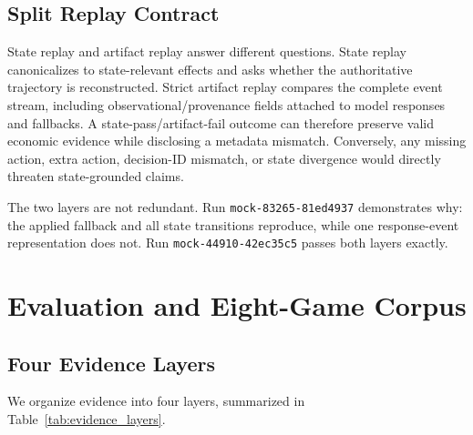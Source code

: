 \documentclass[conference]{IEEEtran}
\newcommand{\code}[1]{\texttt{#1}}
\begin{document}
\subsection{Split Replay Contract}

State replay and artifact replay answer different questions. State replay canonicalizes to state-relevant effects and asks whether the authoritative trajectory is reconstructed. Strict artifact replay compares the complete event stream, including observational/provenance fields attached to model responses and fallbacks. A state-pass/artifact-fail outcome can therefore preserve valid economic evidence while disclosing a metadata mismatch. Conversely, any missing action, extra action, decision-ID mismatch, or state divergence would directly threaten state-grounded claims.

The two layers are not redundant. Run \code{mock-83265-81ed4937} demonstrates why: the applied fallback and all state transitions reproduce, while one response-event representation does not. Run \code{mock-44910-42ec35c5} passes both layers exactly.

\section{Evaluation and Eight-Game Corpus}
\label{sec:evaluation}

\subsection{Four Evidence Layers}

We organize evidence into four layers, summarized in Table~\ref{tab:evidence_layers}.
\end{document}
